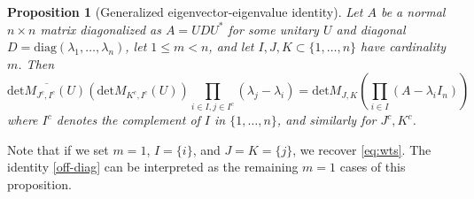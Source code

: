 \documentclass{amsart}
\newtheorem{proposition}[lemma]{Proposition}
\begin{document}
\begin{proposition}[Generalized eigenvector-eigenvalue identity]  Let $A$ be a normal $n \times n$ matrix diagonalized as $A = UDU^*$ for some unitary $U$ and diagonal $D = \mathrm{diag}(\lambda_1,\dots,\lambda_n)$, let $1 \leq m < n$, and let $I,J,K \subset \{1,\dots,n\}$ have cardinality $m$.  Then
$$ \overline{\mathrm{det} M_{J^c,I^c}(U)} (\mathrm{det} M_{K^c,I^c}(U)) \prod_{i \in I, j \in I^c} (\lambda_j - \lambda_i) = \mathrm{det} M_{J,K}( \prod_{i \in I} (A - \lambda_i I_n) )$$
where $I^c$ denotes the complement of $I$ in $\{1,\dots,n\}$, and similarly for $J^c,K^c$.
\end{proposition}

Note that if we set $m=1$, $I = \{i\}$, and $J=K=\{j\}$, we recover \eqref{eq:wts}.  The identity \eqref{off-diag} can be interpreted as the remaining $m=1$ cases of this proposition.
\end{document}

